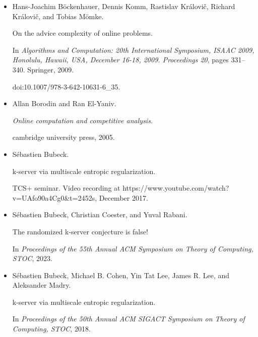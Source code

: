 \documentclass[10pt,a4paper]{article}
\begin{document}
\begin{itemize}
\item[] 
[11]

Hans-Joachim Böckenhauer, Dennis Komm, Rastislav Královič,
Richard Královič, and Tobias Mömke.


On the advice complexity of online problems.


In \emph{Algorithms and Computation: 20th International Symposium,
ISAAC 2009, Honolulu, Hawaii, USA, December 16-18, 2009. Proceedings 20},
pages 331–340. Springer, 2009.


doi:10.1007/978-3-642-10631-6\_35.





\item[] 
[12]

Allan Borodin and Ran El-Yaniv.


\emph{Online computation and competitive analysis}.


cambridge university press, 2005.





\item[] 
[13]

Sébastien Bubeck.


k-server via multiscale entropic regularization.


TCS+ seminar. Video recording at
https://www.youtube.com/watch?v=UAfo90a4Cg0\&t=2452s, December 2017.





\item[] 
[14]

Sébastien Bubeck, Christian Coester, and Yuval Rabani.


The randomized k-server conjecture is false!


In \emph{Proceedings of the 55th Annual ACM Symposium on Theory of
Computing, STOC}, 2023.





\item[] 
[15]

Sébastien Bubeck, Michael B. Cohen, Yin Tat Lee, James R. Lee, and
Aleksander Madry.


k-server via multiscale entropic regularization.


In \emph{Proceedings of the 50th Annual ACM SIGACT Symposium on
Theory of Computing, STOC}, 2018.






\end{itemize}
\end{document}
